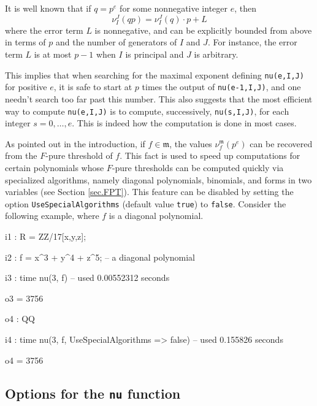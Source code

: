 \documentclass{amsart}
\begin{document}

It is well known that if $q=p^e$ for some nonnegative integer $e$, then \[ \nu_I^J(qp) = \nu_I^J(q)\cdot p + L\]  where the error term $L$ is nonnegative, and can be explicitly bounded from above in terms of $p$ and the number of generators of $I$ and $J$.  For instance, the error term $L$ is at most $p-1$ when $I$ is principal and $J$ is arbitrary.

This implies that when searching for the maximal exponent defining {\tt nu(e,I,J)} for positive $e$, it is safe to start at $p$ times the output of {\tt nu(e-1,I,J)}, and one needn't search too far past this number.  This also suggests that the most efficient way to compute {\tt nu(e,I,J)} is to compute, successively, {\tt nu(s,I,J)}, for each integer $s = 0,\ldots,e$.  This is indeed how the computation is done in most cases.

As pointed out in the introduction, if $f \in \mathfrak{m}$, the values $\nu^{\mathfrak{m}}_f(p^e)$ can be recovered from the $F$-pure threshold of $f$.
This fact is used to speed up computations for certain polynomials whose $F$-pure thresholds can be computed quickly via specialized algorithms, namely diagonal polynomials, binomials, and forms in two variables (see Section \ref{sec.FPT}).  This feature can be disabled by setting the option {\tt UseSpecialAlgorithms} (default value {\tt true}) to {\tt false}.  Consider the following example, where $f$ is a diagonal polynomial.

\medspace
{\small
{}
\begin{MyVerbatim}

i1 : R = ZZ/17[x,y,z];

i2 : f = x^3 + y^4 + z^5; -- a diagonal polynomial

i3 : time nu(3, f)
     -- used 0.00552312 seconds

o3 = 3756

o4 : QQ

i4 : time nu(3, f, UseSpecialAlgorithms => false)
     -- used 0.155826 seconds

o4 = 3756
\end{MyVerbatim}
}
\medspace



\subsection*{Options for the {\tt nu} function}
\end{document}
